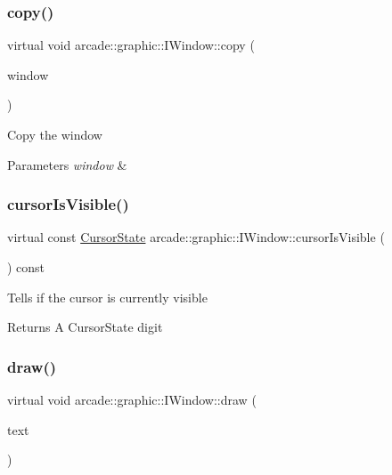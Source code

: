 \subsubsection{\texorpdfstring{copy()}{copy()}}
{\footnotesize\ttfamily virtual void arcade\+::graphic\+::\+I\+Window\+::copy (\begin{DoxyParamCaption}\item[{const \mbox{\hyperlink{classarcade_1_1graphic_1_1_i_window}{I\+Window}} \&}]{window }\end{DoxyParamCaption})\hspace{0.3cm}{\ttfamily [pure virtual]}}

Copy the window 
\begin{DoxyParams}{Parameters}
{\em window} & \\
\hline
\end{DoxyParams}
\mbox{\label{classarcade_1_1graphic_1_1_i_window_aed6a4805e9b3ed9cdb42008a4e767778}} 
\subsubsection{\texorpdfstring{cursorIsVisible()}{cursorIsVisible()}}
{\footnotesize\ttfamily virtual const \mbox{\hyperlink{classarcade_1_1graphic_1_1_i_window_aa88d1788d30d459f166dd29dbe5b5f7f}{Cursor\+State}} arcade\+::graphic\+::\+I\+Window\+::cursor\+Is\+Visible (\begin{DoxyParamCaption}{ }\end{DoxyParamCaption}) const\hspace{0.3cm}{\ttfamily [pure virtual]}}

Tells if the cursor is currently visible \begin{DoxyReturn}{Returns}
A Cursor\+State digit 
\end{DoxyReturn}
\mbox{\label{classarcade_1_1graphic_1_1_i_window_a11f9f08e00f3393afda503614c0246e0}} 
\subsubsection{\texorpdfstring{draw()}{draw()}\hspace{0.1cm}{\footnotesize\ttfamily [1/2]}}
{\footnotesize\ttfamily virtual void arcade\+::graphic\+::\+I\+Window\+::draw (\begin{DoxyParamCaption}\item[{const \mbox{\hyperlink{classarcade_1_1graphic_1_1_i_text}{I\+Text}} \&}]{text }\end{DoxyParamCaption})\hspace{0.3cm}{\ttfamily [pure virtual]}}

